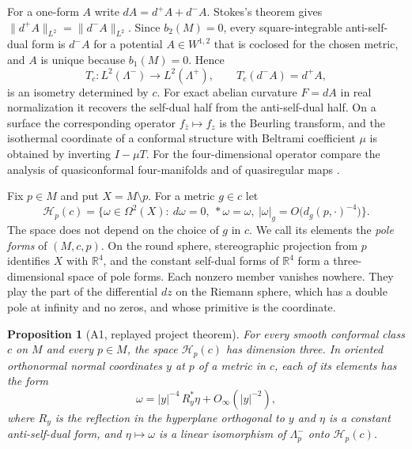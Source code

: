 \documentclass[11pt,letterpaper]{article}
\numberwithin{equation}{section}
\newtheorem{proposition}[theorem]{Proposition}
\begin{document}
For a one-form \(A\) write \(dA=d^+A+d^-A\). Stokes's theorem gives
\(\|d^+A\|_{L^2}=\|d^-A\|_{L^2}\). Since \(b_2(M)=0\), every
square-integrable anti-self-dual form is \(d^-A\) for a potential \(A\in W^{1,2}\)
that is coclosed for the chosen metric, and \(A\) is unique because
\(b_1(M)=0\). Hence
\begin{equation}\label{eq:transfer}
 T_c\colon L^2(\Lambda^-)\longrightarrow L^2(\Lambda^+),\qquad
 T_c(d^-A)=d^+A,
\end{equation}
is an isometry determined by \(c\). For exact abelian curvature \(F=dA\) in real normalization it
recovers the self-dual half from the anti-self-dual half. On a surface the corresponding operator
\(f_{\bar z}\mapsto f_z\) is the Beurling transform, and the isothermal
coordinate of a conformal structure with Beltrami coefficient \(\mu\)
is obtained by inverting \(I-\mu T\). For the four-dimensional operator
compare the analysis of quasiconformal four-manifolds and of
quasiregular maps \cite{DonaldsonSullivan1989,IwaniecMartin1993}.

Fix \(p\in M\) and put \(X=M\setminus p\). For a metric \(g\in c\) let
\begin{equation}\label{eq:pole-space}
 \mathcal H_p(c)=\bigl\{\omega\in\Omega^2(X):\ d\omega=0,\
 {*}\omega=\omega,\ |\omega|_g=O\bigl(d_g(p,\cdot)^{-4}\bigr)\bigr\}.
\end{equation}
The space does not depend on the choice of \(g\) in \(c\). We call its
elements the \emph{pole forms} of \((M,c,p)\). On the round sphere, stereographic
projection from \(p\) identifies \(X\) with \(\mathbb R^4\), and the
constant self-dual forms of \(\mathbb R^4\) form a three-dimensional
space of pole forms. Each nonzero member vanishes nowhere. They play the part of the differential \(dz\) on the
Riemann sphere, which has a double pole at infinity and no zeros, and
whose primitive is the coordinate.

\begin{proposition}[A1, replayed project theorem]\label{prop:pole}
For every smooth conformal class \(c\) on \(M\) and every \(p\in M\),
the space \(\mathcal H_p(c)\) has dimension three. In oriented orthonormal normal coordinates
\(y\) at \(p\) of a metric in \(c\), each of its elements has the form
\[
 \omega=|y|^{-4}\,R_y^*\eta+O_\infty(|y|^{-2}),
\]
where \(R_y\) is the reflection in the hyperplane orthogonal to \(y\)
and \(\eta\) is a constant anti-self-dual form, and
\(\eta\mapsto\omega\) is a linear isomorphism of \(\Lambda^-_p\) onto
\(\mathcal H_p(c)\).
\end{proposition}
\end{document}
